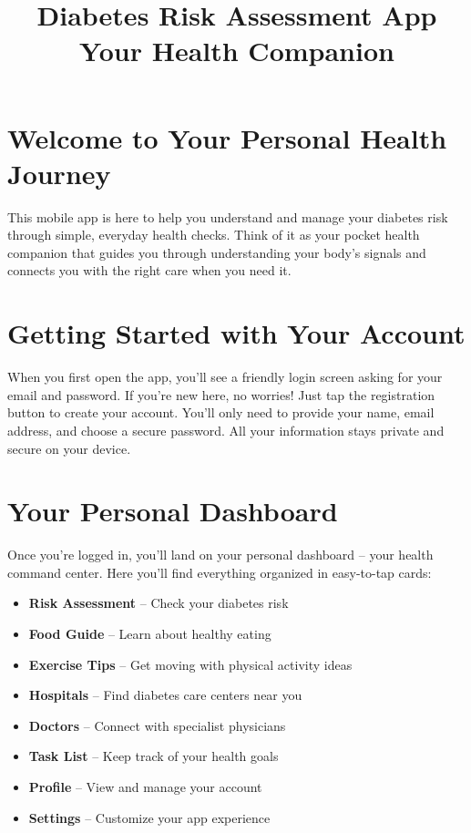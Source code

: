 \documentclass[12pt,a4paper]{article}
\title{\textbf{Diabetes Risk Assessment App}\\Your Health Companion}
\author{}
\date{}
\begin{document}
\maketitle

\section{Welcome to Your Personal Health Journey}

This mobile app is here to help you understand and manage your diabetes risk through simple, everyday health checks. Think of it as your pocket health companion that guides you through understanding your body's signals and connects you with the right care when you need it.

\section{Getting Started with Your Account}

When you first open the app, you'll see a friendly login screen asking for your email and password. If you're new here, no worries! Just tap the registration button to create your account. You'll only need to provide your name, email address, and choose a secure password. All your information stays private and secure on your device.

\section{Your Personal Dashboard}

Once you're logged in, you'll land on your personal dashboard -- your health command center. Here you'll find everything organized in easy-to-tap cards:

\begin{itemize}
    \item \textbf{Risk Assessment} -- Check your diabetes risk
    \item \textbf{Food Guide} -- Learn about healthy eating
    \item \textbf{Exercise Tips} -- Get moving with physical activity ideas
    \item \textbf{Hospitals} -- Find diabetes care centers near you
    \item \textbf{Doctors} -- Connect with specialist physicians
    \item \textbf{Task List} -- Keep track of your health goals
    \item \textbf{Profile} -- View and manage your account
    \item \textbf{Settings} -- Customize your app experience
\end{itemize}
\end{document}
